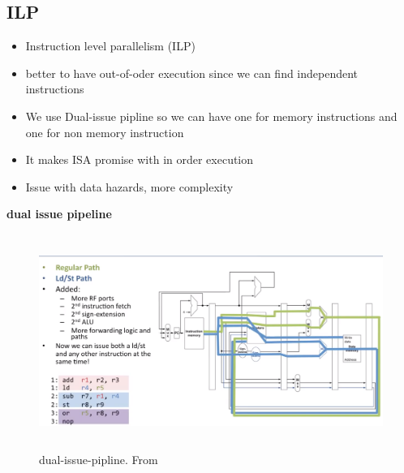 \subsection{ILP}
\begin{itemize}
\item  Instruction level parallelism (ILP)
\item  better to have out-of-oder execution since we can find independent instructions
\item  We use Dual-issue pipline so we can have one for memory instructions and
  one for non memory instruction
\item  It makes ISA promise with in order execution
\item  Issue with data hazards, more complexity
\end{itemize}


\textbf{dual issue pipeline}
\begin{figure}[h]
    \vspace{10mm}
    \centering
    \includegraphics[width=16cm, height=7cm]{image/dual-issue-pipline.png}
    \caption{dual-issue-pipline. From \cite{}}
\end{figure}
